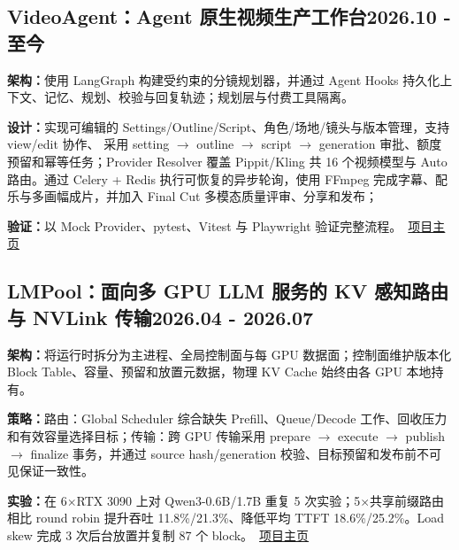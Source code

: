 \documentclass[a4paper, 12pt]{article}
\begin{document}
\subsection{{VideoAgent：Agent 原生视频生产工作台}\hfill 2026.10 - 至今}
\begin{zitemize}
\item \textbf{架构：}使用 LangGraph 构建受约束的分镜规划器，并通过 Agent Hooks 持久化上下文、记忆、规划、校验与回复轨迹；规划层与付费工具隔离。
\item \textbf{设计：}实现可编辑的 Settings/Outline/Script、角色/场地/镜头与版本管理，支持 view/edit 协作、 采用 setting $\rightarrow$ outline $\rightarrow$ script $\rightarrow$ generation 审批、额度预留和幂等任务；Provider Resolver 覆盖 Pippit/Kling 共 16 个视频模型与 Auto 路由。通过 Celery + Redis 执行可恢复的异步轮询，使用 FFmpeg 完成字幕、配乐与多画幅成片，并加入 Final Cut 多模态质量评审、分享和发布；
\item \textbf{验证：}以 Mock Provider、pytest、Vitest 与 Playwright 验证完整流程。\ \href{https://0x0addc001.github.io/VideoAgent/}{项目主页}
\end{zitemize}

\vspace*{8pt}
\subsection{{LMPool：面向多 GPU LLM 服务的 KV 感知路由与 NVLink 传输}\hfill 2026.04 - 2026.07}
\begin{zitemize}
\item \textbf{架构：}将运行时拆分为主进程、全局控制面与每 GPU 数据面；控制面维护版本化 Block Table、容量、预留和放置元数据，物理 KV Cache 始终由各 GPU 本地持有。
\item \textbf{策略：}路由：Global Scheduler 综合缺失 Prefill、Queue/Decode 工作、回收压力和有效容量选择目标；传输：跨 GPU 传输采用 prepare $\rightarrow$ execute $\rightarrow$ publish $\rightarrow$ finalize 事务，并通过 source hash/generation 校验、目标预留和发布前不可见保证一致性。
\item \textbf{实验：}在 6$\times$RTX 3090 上对 Qwen3-0.6B/1.7B 重复 5 次实验；5$\times$共享前缀路由相比 round robin 提升吞吐 11.8\%/21.3\%、降低平均 TTFT 18.6\%/25.2\%。Load skew 完成 3 次后台放置并复制 87 个 block。\ \href{https://0x0addc001.github.io/LMPool/}{项目主页}
\end{zitemize}
\end{document}
